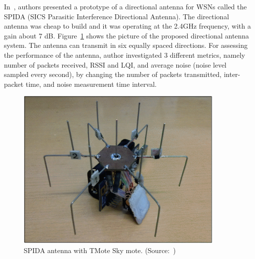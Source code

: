 \documentclass[12pt, oneandhalf, chaparabic, sees, ms]{metu}
\begin{document}
\newpage





In~\cite{nilsson2009, nilsson2010, Öström2010, mottola2013}, authors presented a prototype of a directional antenna for WSNs called the
SPIDA (SICS Parasitic Interference Directional Antenna). The directional antenna was cheap to build and it was operating at the 2.4GHz frequency, with a gain about 7 dB. 
Figure~\ref{fig:spida} shows the picture of the proposed directional antenna system.
The antenna can transmit in six equally spaced directions. For assessing the performance of the antenna, 
author investigated 3 different metrics, namely number of packets received, RSSI and LQI, and average noise (noise level sampled every second), 
by changing the number of packets transmitted, inter-packet time, and noise measurement time interval. 

\vspace{2cm}
% 
%
%
\begin{figure}[!htbp]
 \begin{center}
  \includegraphics[width=0.9\textwidth]{spida.png}
 \end{center}
 \caption{SPIDA antenna with TMote Sky mote. (Source:~\protect\cite{mottola2013}) }
  \label{fig:spida}
\end{figure}
% 
%
%
% 
%
%
\end{document}

